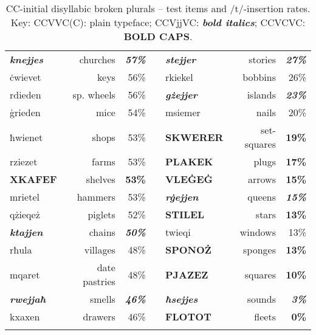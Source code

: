 \documentclass[output=paper]{langsci/langscibook}
\begin{document}
\begin{table}
\begin{tabularx}{\textwidth}{lrr X lrr}
\textbf{\textit{knejjes}} & churches & \textbf{\textit{57\%}} &  & \textbf{\textit{stejjer}} & stories & \textbf{\textit{27\%}}\\
\.cwievet & keys & 56\% &  & rkiekel & bobbins & 26\%\\
rdieden & sp. wheels & 56\% &  & \textbf{\textit{gżejjer}} & islands & \textbf{\textit{23\%}}\\
\.grieden & mice & 54\% &  & msiemer & nails & 20\%\\
ħwienet & shops & 53\% &  & \textbf{\textsc{SKWERER}} & set-squares & \textbf{\textsc{19\%}}\\
rziezet & farms & 53\% &  & \textbf{\textsc{PLAKEK}} & plugs & \textbf{\textsc{17\%}}\\
\textbf{\textsc{XKAFEF}} & shelves & \textbf{\textsc{53\%}} &  & \textbf{\textsc{VLE\.GE\.G}} & arrows & \textbf{\textsc{15\%}}\\
mrietel & hammers & 53\% &  & \textbf{\textit{r\.gejjen}} & queens & \textbf{\textit{15\%}}\\
qżieqeż & piglets & 52\% &  & \textbf{\textsc{STILEL}} & stars & \textbf{\textsc{13\%}}\\
\textbf{\textit{ktajjen}} & chains & \textbf{\textit{50\%}} &  & twieqi & windows & 13\%\\
rħula & villages & 48\% &  & \textbf{\textsc{SPONOŻ}} & sponges & \textbf{\textsc{13\%}}\\
mqaret & date pastries & 48\% &  & \textbf{\textsc{PJAZEZ}} & squares & \textbf{\textsc{10\%}}\\
\textbf{\textit{rwejjaħ}} & smells & \textbf{\textit{46\%}} &  & \textbf{\textit{ħsejjes}} & sounds & \textbf{\textit{3\%}}\\
kxaxen & drawers & 46\% &  & \textbf{\textsc{FLOTOT}} & fleets & \textbf{\textsc{0\%}}\\
\lspbottomrule
\end{tabularx}
\caption{
CC-initial  {disyllabic} broken plurals – test items and /t/-insertion rates. Key: CCVVC(C): plain typeface; CCVjjVC: \textbf{\textit{bold italics}};
CCVCVC: \textbf{BOLD CAPS}.
}\label{tab:lucas:7}
\end{table}
\end{document}
